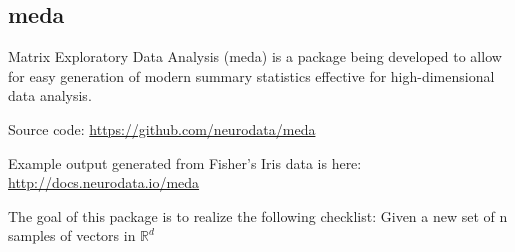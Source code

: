 \documentclass[simplex.tex]{subfiles}
\begin{document}


\subsection{meda}

Matrix Exploratory Data Analysis (meda) is a package being developed to
allow for easy generation of modern summary statistics effective for
high-dimensional data analysis. 

\begin{compactitem}
  \item Source code: \href{https://github.com/neurodata/meda}{https://github.com/neurodata/meda}
  \item Example output generated from Fisher's Iris data is here:
    \href{http://docs.neurodata.io/meda}{http://docs.neurodata.io/meda}
\end{compactitem}

The goal of this package is to realize the following checklist: Given a new set of n samples of vectors in $\mathbb{R}^d$
\end{document}
